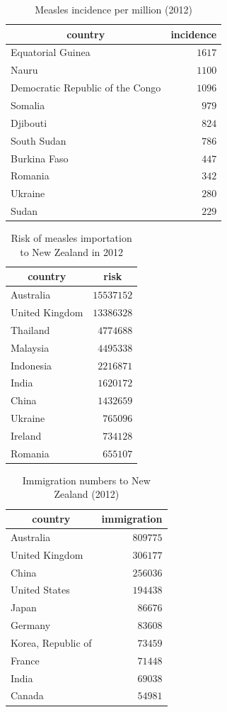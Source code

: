 \documentclass{article}
\begin{document}
\begin{table}
\caption{Measles incidence per million (2012)}
\begin{center}
\begin{tabular}{lr}
\hline\hline
\multicolumn{1}{c}{country}&\multicolumn{1}{c}{incidence}\tabularnewline
\hline
Equatorial Guinea&$1617$\tabularnewline
Nauru&$1100$\tabularnewline
Democratic Republic of the Congo&$1096$\tabularnewline
Somalia&$ 979$\tabularnewline
Djibouti&$ 824$\tabularnewline
South Sudan&$ 786$\tabularnewline
Burkina Faso&$ 447$\tabularnewline
Romania&$ 342$\tabularnewline
Ukraine&$ 280$\tabularnewline
Sudan&$ 229$\tabularnewline
\hline
\end{tabular}\end{center}\label{table:incidence12}
\end{table}

\begin{table}
\caption{Risk of measles importation to New Zealand in 2012}
\begin{center}
\begin{tabular}{lr}
\hline\hline
\multicolumn{1}{c}{country}&\multicolumn{1}{c}{risk}\tabularnewline
\hline
Australia&$15537152$\tabularnewline
United Kingdom&$13386328$\tabularnewline
Thailand&$ 4774688$\tabularnewline
Malaysia&$ 4495338$\tabularnewline
Indonesia&$ 2216871$\tabularnewline
India&$ 1620172$\tabularnewline
China&$ 1432659$\tabularnewline
Ukraine&$  765096$\tabularnewline
Ireland&$  734128$\tabularnewline
Romania&$  655107$\tabularnewline
\hline
\end{tabular}\end{center}\label{table:risk12}
\end{table}



\begin{table}
\caption{Immigration numbers to New Zealand (2012)}
\begin{center}
\begin{tabular}{lr}
\hline\hline
\multicolumn{1}{c}{country}&\multicolumn{1}{c}{immigration}\tabularnewline
\hline
Australia&$809775$\tabularnewline
United Kingdom&$306177$\tabularnewline
China&$256036$\tabularnewline
United States&$194438$\tabularnewline
Japan&$ 86676$\tabularnewline
Germany&$ 83608$\tabularnewline
Korea, Republic of&$ 73459$\tabularnewline
France&$ 71448$\tabularnewline
India&$ 69038$\tabularnewline
Canada&$ 54981$\tabularnewline
\hline
\end{tabular}\end{center}\label{table:immigration12}
\end{table}
\end{document}
